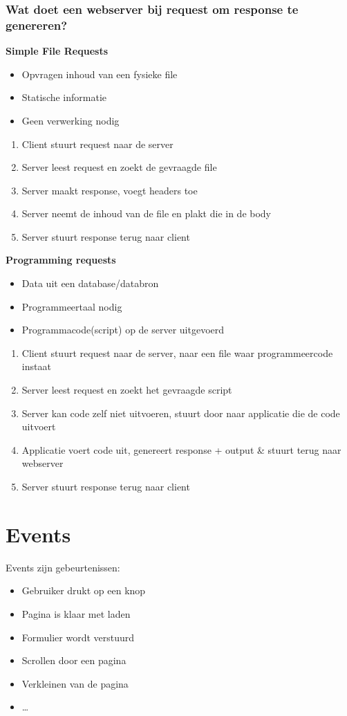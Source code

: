 \documentclass{article}
\newcommand{\bold}[1]{\textbf{#1}}
\begin{document}
\subsubsection{Wat doet een webserver bij request om response te genereren?}
\bold{Simple File Requests}
\begin{itemize}
    \item Opvragen inhoud van een fysieke file
    \item Statische informatie
    \item Geen verwerking nodig
\end{itemize}
\begin{enumerate}
    \item Client stuurt request naar de server 
    \item Server leest request en zoekt de gevraagde file
    \item Server maakt response, voegt headers toe
    \item Server neemt de inhoud van de file en plakt die in de body
    \item Server stuurt response terug naar client
\end{enumerate}

\bold{Programming requests}
\begin{itemize}
    \item Data uit een database/databron
    \item Programmeertaal nodig
    \item Programmacode(script) op de server uitgevoerd
\end{itemize}

\begin{enumerate}
    \item Client stuurt request naar de server, naar een file waar programmeercode instaat
    \item Server leest request en zoekt het gevraagde script
    \item Server kan code zelf niet uitvoeren, stuurt door naar applicatie die de code uitvoert
    \item Applicatie voert code uit, genereert response + output \& stuurt terug naar webserver
    \item Server stuurt response terug naar client
\end{enumerate}

\section{Events}
Events zijn gebeurtenissen:
\begin{itemize}
    \item Gebruiker drukt op een knop
    \item Pagina is klaar met laden
    \item Formulier wordt verstuurd
    \item Scrollen door een pagina
    \item Verkleinen van de pagina
    \item \dots
\end{itemize}
\end{document}
